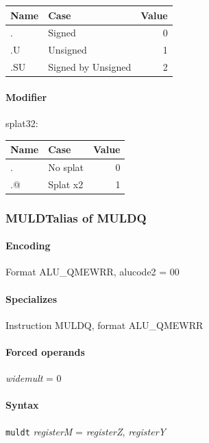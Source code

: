 {\noindent \begin{tabular}{|l|l|r|} \hline
\bf{Name} & \bf{Case} & \bf{Value} \\ \hline
. & Signed & 0 \\
.U & Unsigned & 1 \\
.SU & Signed by Unsigned & 2 \\
\hline \end{tabular}

\paragraph{Modifier} \textsf{splat32}:\\

\noindent \begin{tabular}{|l|l|r|} \hline
\bf{Name} & \bf{Case} & \bf{Value} \\ \hline
. & No splat & 0 \\
.@ & Splat x2 & 1 \\
\hline \end{tabular}
\newpage
\subsubsection[{\small MULDT: alias of MULDQ}]{MULDT\hfill alias of MULDQ}
\label{instr:MULDT}

\paragraph{Encoding} Format \textsf{ALU\_QMEWRR, alucode2 = 00}\\



\paragraph{Specializes} Instruction MULDQ, format ALU\_QMEWRR

\paragraph{Forced operands} \emph{widemult} = 0

\paragraph{Syntax} \texttt{muldt} \emph{registerM} = \emph{registerZ}, \emph{registerY}

}
